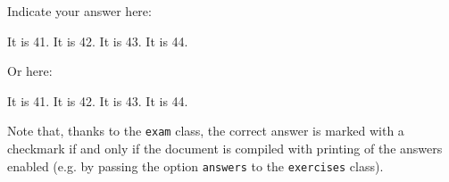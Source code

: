 Indicate your answer here:

\begin{checkboxes}
	\choice It is 41.
	\choice It is 42.
	\CorrectChoice It is 43.
	\choice It is 44.
\end{checkboxes}

Or here:

\begin{oneparcheckboxes}
	\choice It is 41.
	\choice It is 42.
	\CorrectChoice It is 43.
	\choice It is 44.
\end{oneparcheckboxes}

\begin{solution}
	Note that, thanks to the \texttt{exam} class, the correct answer is marked with a checkmark if and only if the document is compiled with printing of the answers enabled (e.g. by passing the option \texttt{answers} to the \texttt{exercises} class).
\end{solution}
